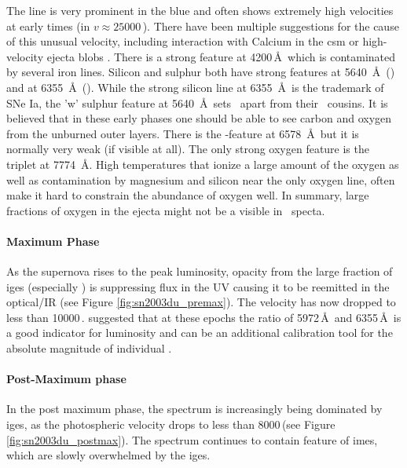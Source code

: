 The  line is very prominent in the blue and often shows extremely high velocities at early times (in  $v \approx 25000$\,\kms). There have been multiple suggestions for the cause of this unusual velocity, including interaction with Calcium in the \gls{csm} or high-velocity ejecta blobs \citep{1999ApJ...525..881H,2004ApJ...607..391G,2004ApJ...601.1019T,2005ApJ...623L..37M,2006ApJ...636..400Q,2006ApJ...645..470T,2007A&A...471..527G}. There is a strong  feature at 4200\,\AA\ which is contaminated by several iron lines. Silicon and sulphur both have strong features at 5640~\AA\ () and at 6355~\AA\ (). While the strong silicon line at 6355~\AA\ is the trademark of SNe Ia, the 'w' sulphur feature at 5640~\AA\ sets \sneia\ apart from their \sneibc\ cousins. It is believed that in these early phases one should be able to see carbon and oxygen from the unburned outer layers. There is the -feature at 6578~\AA\ but it is normally very weak (if visible at all). The only strong oxygen feature is the  triplet at 7774~\AA. High temperatures that ionize a large amount of the oxygen as well as contamination by magnesium and silicon near the only oxygen line, often make it hard to constrain the abundance of oxygen well. In summary, large fractions of oxygen in the ejecta might not be a visible in \sneia\ specta. 

\paragraph{Maximum Phase} As the supernova rises to the peak luminosity, opacity from the large fraction of \glspl{ige} (especially \Ni) is suppressing flux in the UV causing it to be reemitted in the optical/IR  (see Figure \ref{fig:sn2003du_premax}). The velocity has now dropped to less than 10000\,\kms. \citet{1995ApJ...455L.147N} suggested that at these epochs the ratio of  5972\,\AA\ and  6355\,\AA\ is a good indicator for luminosity and can be an additional calibration tool for the absolute magnitude of individual \sneia.


\paragraph{Post-Maximum phase}
In the post maximum phase, the spectrum is increasingly being dominated by \glspl{ige}, as the photospheric velocity drops to less than 8000\,\kms (see Figure \ref{fig:sn2003du_postmax}). The spectrum continues to contain feature of \glspl{ime}, which are slowly overwhelmed by the \glspl{ige}.


